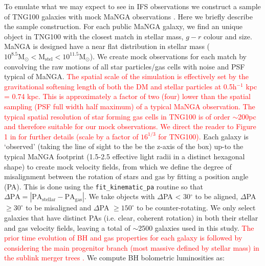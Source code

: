 \documentclass[fleqn,usenatbib]{mnras}
\newcommand{\red}[1]{{\textcolor{red}{#1}}}
\begin{document}
To emulate what we may expect to see in IFS observations we construct a sample of TNG100 galaxies with mock MaNGA observations \citep[a complete description is given in][]{duckworth2020}. Here we briefly describe the sample construction. 
For each public MaNGA galaxy, we find an unique object in TNG100 with the closest match in stellar mass, $g-r$ colour and size. MaNGA is designed have a near flat distribution in stellar mass ($\mathrm{10^{8.5} M_{\odot} < M_{stel} < 10^{11.5} M_{\odot}}$). We create mock observations for each match by convolving the raw motions of all star particles/gas cells with noise and PSF typical of MaNGA. \red{The spatial scale of the simulation is effectively set by the gravitational softening length of both the DM and stellar particles at 0.5h$^{-1}$ kpc = 0.74 kpc. This is approximately a factor of two (four) lower than the spatial sampling (PSF full width half maximum) of a typical MaNGA observation. The typical spatial resolution of star forming gas cells in TNG100 is of order $\sim$200pc and therefore suitable for our mock observations. We direct the reader to Figure 1 in \citet{pillepich2019} for further details (scale by a factor of $16^{1/3}$ for TNG100).}
Each galaxy is `observed' (taking the line of sight to the be the z-axis of the box) up-to the typical MaNGA footprint (1.5-2.5 effective light radii in a distinct hexagonal shape) to create mock velocity fields, from which we define the degree of misalignment between the rotation of stars and gas by fitting a position angle (PA). This is done using the \texttt{fit\_kinematic\_pa} routine \citep[see Appendix C of][]{krajnovic2006} so that $\Delta\mathrm{PA = |PA_{stellar} - PA_{gas}|}$. We take objects with $\Delta$PA < 30$^{\circ}$ to be aligned, $\Delta$PA $ \geq 30^{\circ}$ to be misaligned and $\Delta$PA $\geq 150^{\circ}$ to be counter-rotating. We only select galaxies that have distinct PAs (i.e. clear, coherent rotation) in both their stellar and gas velocity fields, leaving a total of $\sim$2500 galaxies used in this study. \red{The prior time evolution of BH and gas properties for each galaxy is followed by considering the main progenitor branch (most massive defined by stellar mass) in the sublink merger trees \citep{rgomez2015}.} We compute BH bolometric luminosities as:
\end{document}
